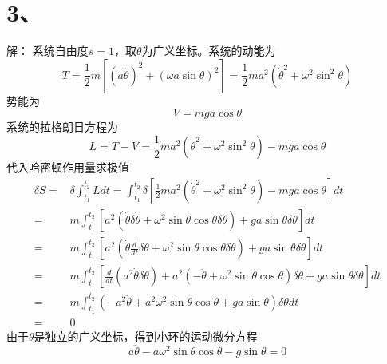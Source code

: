 \documentclass[10pt,a4paper]{article}
\begin{document}
\section*{3、}解：
系统自由度$s=1$，取$\theta$为广义坐标。系统的动能为
\[
T=\frac{1}{2}m[(a\dot{\theta})^2+(\omega a\sin\theta)^2]=\frac{1}{2}ma^2(\dot{\theta}^2+\omega^2\sin^2\theta)
\]
势能为
\[
V=mga\cos\theta
\]
系统的拉格朗日方程为
\[
L=T-V=\frac{1}{2}ma^2(\dot{\theta}^2+\omega^2\sin^2\theta)-mga\cos\theta
\]
代入哈密顿作用量求极值
\begin{align*}
\delta S=&\delta\int_{t_1}^{t_2}Ldt=\int_{t_1}^{t_2}\delta[\frac{1}{2}ma^2(\dot{\theta}^2+\omega^2\sin^2\theta)-mga\cos\theta]dt\\
=&m\int_{t_1}^{t_2}[a^2(\dot{\theta}\delta\dot{\theta}+\omega^2\sin\theta\cos\theta\delta\theta)+ga\sin\theta\delta\theta]dt\\
=&m\int_{t_1}^{t_2}[a^2(\dot{\theta}\frac{d}{dt}\delta\theta+\omega^2\sin\theta\cos\theta\delta\theta)+ga\sin\theta\delta\theta]dt\\
=&m\int_{t_1}^{t_2}[\frac{d}{dt}(a^2\dot{\theta}\delta\theta)+a^2(-\ddot{\theta}+\omega^2\sin\theta\cos\theta)\delta\theta+ga\sin\theta\delta\theta]dt\\
=&m\int_{t_1}^{t_2}(-a^2\ddot{\theta}+a^2\omega^2\sin\theta\cos\theta+ga\sin\theta)\delta\theta dt\\
=&0
\end{align*}
由于$\theta$是独立的广义坐标，得到小环的运动微分方程
\[
a\ddot{\theta}-a\omega^2\sin\theta\cos\theta-g\sin\theta=0
\]
\end{document}
